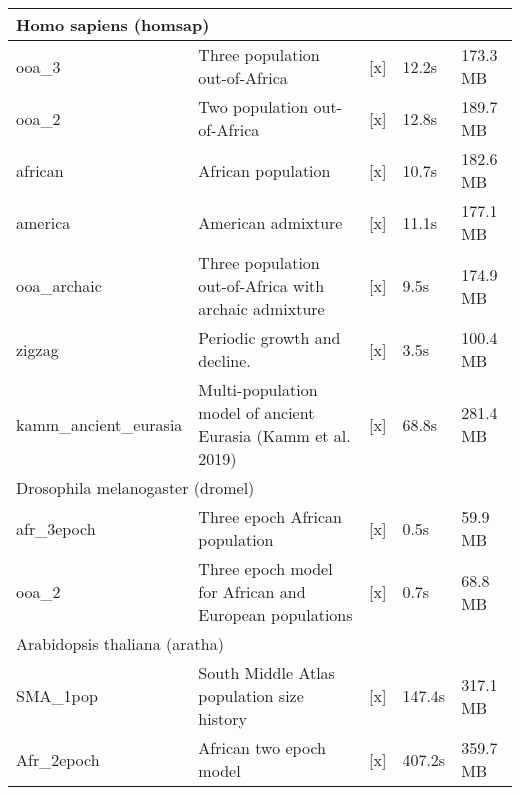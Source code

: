 \begin{tabular}{lllll}
\hline
\multicolumn{5}{l}{ Homo sapiens (homsap) } \\
\hline
ooa\_3& Three population out-of-Africa& [x]& 12.2s& 173.3 MB\\
ooa\_2& Two population out-of-Africa& [x]& 12.8s& 189.7 MB\\
african& African population& [x]& 10.7s& 182.6 MB\\
america& American admixture& [x]& 11.1s& 177.1 MB\\
ooa\_archaic& Three population out-of-Africa with archaic admixture& [x]& 9.5s& 174.9 MB\\
zigzag& Periodic growth and decline.& [x]& 3.5s& 100.4 MB\\
kamm\_ancient\_eurasia& Multi-population model of ancient Eurasia (Kamm et al. 2019)& [x]& 68.8s& 281.4 MB\\
\hline
\multicolumn{5}{l}{ Drosophila melanogaster (dromel) } \\
\hline
afr\_3epoch& Three epoch African population& [x]& 0.5s& 59.9 MB\\
ooa\_2& Three epoch model for African and European populations& [x]& 0.7s& 68.8 MB\\
\hline
\multicolumn{5}{l}{ Arabidopsis thaliana (aratha) } \\
\hline
SMA\_1pop& South Middle Atlas population size history& [x]& 147.4s& 317.1 MB\\
Afr\_2epoch& African two epoch model& [x]& 407.2s& 359.7 MB\\
\end{tabular}
